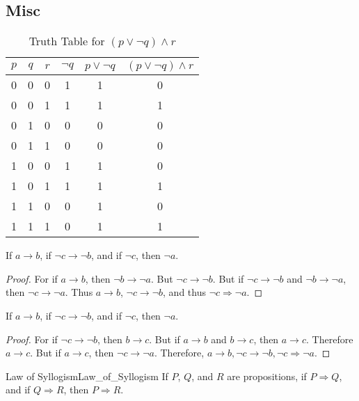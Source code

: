         \subsection{Misc}
        \begin{table}[H]
            \centering
            \captionsetup{type=table}
            \begin{tabular}{c c c c c c}
                \hline
                $p$&$q$&$r$&$\neg{q}$&$p\lor\neg{q}$&$(p\lor\neg{q})\land{r}$\\
                \hline
                0&0&0&1&1&0\\
                0&0&1&1&1&1\\
                0&1&0&0&0&0\\
                0&1&1&0&0&0\\
                1&0&0&1&1&0\\
                1&0&1&1&1&1\\
                1&1&0&0&1&0\\
                1&1&1&0&1&1\\
                \hline
            \end{tabular}
            \caption{Truth Table for $(p\lor\neg{q})\land{r}$}
            \label{tab:Truth_Table_Example}
        \end{table}
        \begin{theorem}
            If $a\rightarrow{b}$, if $\neg{c}\rightarrow\neg{b}$, and if
            $\neg{c}$, then $\neg{a}$.
        \end{theorem}
        \begin{proof}
            For if $a\rightarrow{b}$, then $\neg{b}\rightarrow\neg{a}$. But
            $\neg{c}\rightarrow\neg{b}$. But if $\neg{c}\rightarrow\neg{b}$ and
            $\neg{b}\rightarrow\neg{a}$, then $\neg{c}\rightarrow\neg{a}$. Thus
            $a\rightarrow{b}$, $\neg{c}\rightarrow\neg{b}$, and thus
            $\neg{c}\Rightarrow\neg{a}$.
        \end{proof}
        \begin{problem}
            If $a\rightarrow{b}$, if $\neg{c}\rightarrow\neg{b}$, and if
            $\neg{c}$, then $\neg{a}$.
        \end{problem}
        \begin{proof}
            For if $\neg c \rightarrow \neg b$, then $b\rightarrow c$. But if
            $a\rightarrow b$ and $b\rightarrow c$, then $a\rightarrow c$.
            Therefore $a\rightarrow c$. But if $a\rightarrow c$, then
            $\neg c \rightarrow \neg a$. Therefore,
            $a\rightarrow b,\neg c\rightarrow\neg b,\neg c\Rightarrow\neg a$.
        \end{proof}
        \begin{ftheorem}{Law of Syllogism}{Law_of_Syllogism}
            If $P$, $Q$, and $R$ are propositions, if $P\Rightarrow{Q}$, and if
            $Q\Rightarrow{R}$, then $P\Rightarrow{R}$.
        \end{ftheorem}